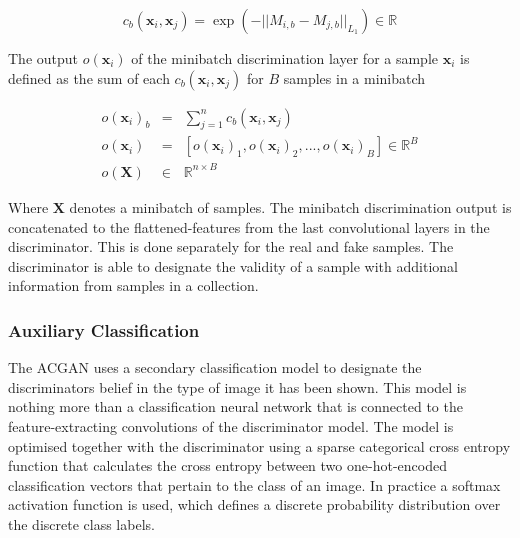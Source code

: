 \documentclass[twocolumn]{article}
\numberwithin{equation}{section}
\begin{document}
\begin{equation}
    c_b(\mathbf{x}_i, \mathbf{x}_j) = \exp({- ||M_{i,b} - M_{j,b}||_{L_1}}) \in \mathbb{R} \nonumber
\end{equation}

The output $o(\mathbf{x}_i)$ of the minibatch discrimination layer for a sample $\mathbf{x}_i$ is defined as the sum of each $c_b(\mathbf{x}_i, \mathbf{x}_j)$ for $B$ samples in a minibatch

\begin{eqnarray}
    o(\mathbf{x}_i)_b &=& \sum_{j=1}^n c_b(\mathbf{x}_i, \mathbf{x}_j) \nonumber \\
    o(\mathbf{x}_i) &=& [o(\mathbf{x}_i)_1, o(\mathbf{x}_i)_2, ..., o(\mathbf{x}_i)_B] \in \mathbb{R}^B \nonumber\\
    o(\mathbf{X}) &\in& \mathbb{R}^{n \times B} \nonumber
\end{eqnarray}

Where $\mathbf{X}$ denotes a minibatch of samples. The minibatch discrimination output is concatenated to the flattened-features from the last convolutional layers in the discriminator. This is done separately for the real and fake samples. The discriminator is able to designate the validity of a sample with additional information from samples in a collection.

\subsubsection{Auxiliary Classification}
The ACGAN uses a secondary classification model to designate the discriminators belief in the type of image it has been shown. This model is nothing more than a classification neural network that is connected to the feature-extracting convolutions of the discriminator model. The model is optimised together with the discriminator using a sparse categorical cross entropy function that calculates the cross entropy between two one-hot-encoded classification vectors that pertain to the class of an image. In practice a softmax activation function is used, which defines a discrete probability distribution over the discrete class labels.


\end{document}

